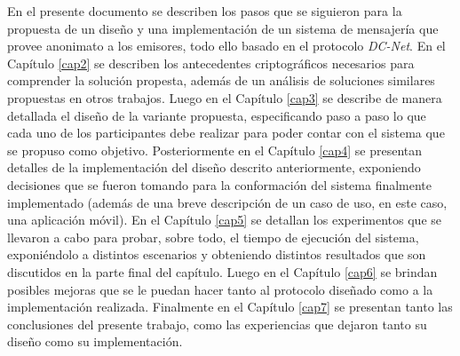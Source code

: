 En el presente documento se describen los pasos que se siguieron para la propuesta de un diseño y una implementación de un sistema de mensajería que 
provee anonimato a los emisores, todo ello basado en el protocolo \emph{DC-Net}. En el Capítulo \ref{cap2} se describen los antecedentes criptográficos 
necesarios para comprender la solución propesta, además de un análisis de soluciones similares propuestas en otros trabajos. Luego en el Capítulo \ref{cap3} 
se describe de manera detallada el diseño de la variante propuesta, especificando paso a paso lo que cada uno de los participantes debe realizar 
para poder contar con el sistema que se propuso como objetivo. Posteriormente en el Capítulo \ref{cap4} se presentan detalles de la implementación del diseño 
descrito anteriormente, exponiendo decisiones que se fueron tomando para la conformación del sistema finalmente implementado (además de una breve 
descripción de un caso de uso, en este caso, una aplicación móvil). En el Capítulo \ref{cap5} se detallan los experimentos que se llevaron a cabo para probar, 
sobre todo, el tiempo de ejecución del sistema, exponiéndolo a distintos escenarios y obteniendo distintos resultados que son discutidos en la parte 
final del capítulo. Luego en el Capítulo \ref{cap6} se 
brindan posibles mejoras que se le puedan hacer tanto al protocolo diseñado como a la implementación realizada. Finalmente en el Capítulo \ref{cap7} se 
presentan tanto las conclusiones del presente trabajo, como las experiencias que dejaron tanto su diseño como su implementación.
